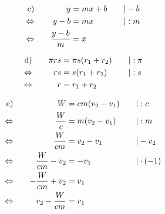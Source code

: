 \begin{exercise}
\begin{minipage}[t]{0.47\linewidth}
\begin{alignat*}{3}
        \text{c)}&\quad
        &
        y&=mx+b
        &
        \quad&|-b
        \\
        \Leftrightarrow&\quad
        &
        y-b&=mx
        &
        \quad&|:m
        \\
        \Leftrightarrow&\quad
        &
        \frac{y-b}{m}&=x
        &
        \quad&\relax
      \end{alignat*}
    \end{minipage}\hfill
    \begin{minipage}[t]{0.51\linewidth}
      \makeatletter\@fleqntrue\makeatother
      \begin{alignat*}{3}
        \text{d)}&\quad
        &
        \pi rs&=\pi s(r_{1}+r_{2})
        &
        \quad&|:\pi
        \\
        \Leftrightarrow&\quad
        &
        rs&=s(r_{1}+r_{2})
        &
        \quad&|:s
        \\
        \Leftrightarrow&\quad
        &
        r&=r_{1}+r_{2}
        &
        \quad&\relax
      \end{alignat*}
    \end{minipage}\par
    \begin{minipage}[t]{0.47\linewidth}
      \makeatletter\@fleqntrue\makeatother
      \begin{alignat*}{3}
        \text{e)}&\quad
        &
        W&=cm(v_{2}-v_{1})
        &
        \quad&|:c
        \\
        \Leftrightarrow&\quad
        &
        \frac{W}{c}&=m(v_{2}-v_{1})
        &
        \quad&|:m
        \\
        \Leftrightarrow&\quad
        &
        \frac{W}{cm}&=v_{2}-v_{1}
        &
        \quad&|-v_{2}
        \\
        \Leftrightarrow&\quad
        &
        \frac{W}{cm}-v_{2}&=-v_{1}
        &
        \quad&|\cdot(-1)
        \\
        \Leftrightarrow&\quad
        &
        -\frac{W}{cm}+v_{2}&=v_{1}
        &
        \quad&\relax
        \\
        \Leftrightarrow&\quad
        &
        v_{2}-\frac{W}{cm}&=v_{1}
        &
        \quad&\relax
      \end{alignat*}
    \end{minipage}\hfill

\end{exercise}
